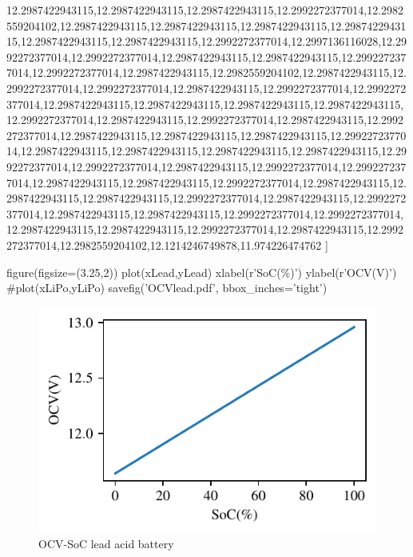 \begin{pylabcode}[plotsession]
12.2987422943115,12.2987422943115,12.2987422943115,12.2992272377014,12.2982559204102,12.2987422943115,12.2987422943115,12.2987422943115,12.2987422943115,12.2987422943115,12.2987422943115,12.2992272377014,12.2997136116028,12.2992272377014,12.2992272377014,12.2987422943115,12.2987422943115,12.2992272377014,12.2992272377014,12.2987422943115,12.2982559204102,12.2987422943115,12.2992272377014,12.2992272377014,12.2987422943115,12.2992272377014,12.2992272377014,12.2987422943115,12.2987422943115,12.2987422943115,12.2987422943115,12.2992272377014,12.2987422943115,12.2992272377014,12.2987422943115,12.2992272377014,12.2987422943115,12.2987422943115,12.2987422943115,12.2992272377014,12.2987422943115,12.2987422943115,12.2987422943115,12.2987422943115,12.2992272377014,12.2992272377014,12.2987422943115,12.2992272377014,12.2992272377014,12.2987422943115,12.2987422943115,12.2992272377014,12.2987422943115,12.2987422943115,12.2987422943115,12.2992272377014,12.2987422943115,12.2992272377014,12.2987422943115,12.2987422943115,12.2992272377014,12.2992272377014,12.2987422943115,12.2987422943115,12.2992272377014,12.2987422943115,12.2992272377014,12.2982559204102,12.1214246749878,11.974226474762 ]
    
    

 
figure(figsize=(3.25,2))
plot(xLead,yLead)
xlabel(r'SoC(\%)')
ylabel(r'OCV(V)')
#plot(xLiPo,yLiPo)
savefig('OCVlead.pdf', bbox_inches='tight')
\end{pylabcode}

\begin{figure}
\centering
\includegraphics{OCVlead}
\caption{\label{fig:OCVLead} OCV-SoC lead acid battery }
\end{figure}


